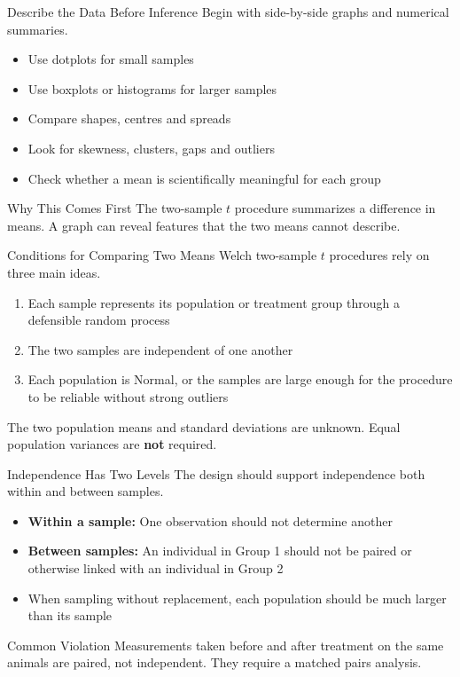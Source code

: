 \documentclass[aspectratio=169,10pt]{beamer}
\begin{document}
\begin{frame}{Describe the Data Before Inference}
Begin with side-by-side graphs and numerical summaries.

\begin{itemize}
  \item Use dotplots for small samples
  \item Use boxplots or histograms for larger samples
  \item Compare shapes, centres and spreads
  \item Look for skewness, clusters, gaps and outliers
  \item Check whether a mean is scientifically meaningful for each group
\end{itemize}

\begin{block}{Why This Comes First}
The two-sample $t$ procedure summarizes a difference in means. A graph can reveal features that the two means cannot describe.
\end{block}
\end{frame}

\begin{frame}{Conditions for Comparing Two Means}
Welch two-sample $t$ procedures rely on three main ideas.

\begin{enumerate}
  \item Each sample represents its population or treatment group through a defensible random process
  \item The two samples are independent of one another
  \item Each population is Normal, or the samples are large enough for the procedure to be reliable without strong outliers
\end{enumerate}

The two population means and standard deviations are unknown. Equal population variances are \textbf{not} required.
\end{frame}

\begin{frame}{Independence Has Two Levels}
The design should support independence both within and between samples.

\begin{itemize}
  \item \textbf{Within a sample:} One observation should not determine another
  \item \textbf{Between samples:} An individual in Group 1 should not be paired or otherwise linked with an individual in Group 2
  \item When sampling without replacement, each population should be much larger than its sample
\end{itemize}

\begin{block}{Common Violation}
Measurements taken before and after treatment on the same animals are paired, not independent. They require a matched pairs analysis.
\end{block}
\end{frame}
\end{document}
